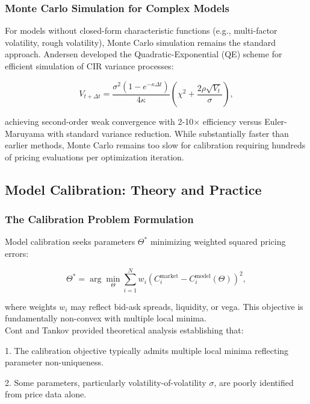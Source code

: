 \documentclass[12pt,a4paper]{article}
\begin{document}
\subsubsection{Monte Carlo Simulation for Complex Models}

For models without closed-form characteristic functions (e.g., multi-factor volatility, rough volatility), Monte Carlo simulation remains the standard approach. Andersen \cite{Andersen2007} developed the Quadratic-Exponential (QE) scheme for efficient simulation of CIR variance processes:

\begin{equation}
V_{t+\Delta t} = \frac{\sigma^2(1-e^{-\kappa\Delta t})}{4\kappa} \left(\chi^2 + \frac{2\rho\sqrt{V_t}}{\sigma}\right),
\end{equation}

achieving second-order weak convergence with 2-10× efficiency versus Euler-Maruyama with standard variance reduction. While substantially faster than earlier methods, Monte Carlo remains too slow for calibration requiring hundreds of pricing evaluations per optimization iteration.

\subsection{Model Calibration: Theory and Practice}

\subsubsection{The Calibration Problem Formulation}

Model calibration seeks parameters $\Theta^*$ minimizing weighted squared pricing errors:

\begin{equation}
\Theta^* = \arg\min_\Theta \sum_{i=1}^N w_i (C_i^{\text{market}} - C_i^{\text{model}}(\Theta))^2,
\end{equation}

where weights $w_i$ may reflect bid-ask spreads, liquidity, or vega. This objective is fundamentally non-convex with multiple local minima.\\[0.05cm]

Cont and Tankov \cite{Cont2003} provided theoretical analysis establishing that:

1. The calibration objective typically admits multiple local minima reflecting parameter non-uniqueness.

2. Some parameters, particularly volatility-of-volatility $\sigma$, are poorly identified from price data alone.
\end{document}
